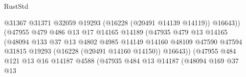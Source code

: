 \begin{lexlean}{RustStd}
\begin{coremodule}
                                                @31367
                                                @31371
                                                @32059
                                                @19293
                                                (@16228 (@20491 @14139 @14119))
                                                @16643))
                                            (@47955
                                              @479
                                              @486
                                              @13
                                              @17
                                              @14165
                                              @14189
                                              (@47935
                                                @479
                                                @13
                                                @14165
                                                (@48094
                                                  @133
                                                  @37
                                                  @13
                                                  @4802
                                                  @4985
                                                  @14149
                                                  @14160
                                                  @48109
                                                  @47590
                                                  @47594
                                                  @31815
                                                  @19293
                                                  (@16228 (@20491 @14160 @14150))
                                                  @16643))
                                              (@47955
                                                @484
                                                @121
                                                @13
                                                @16
                                                @14187
                                                @4588
                                                (@47935
                                                  @484
                                                  @13
                                                  @14187
                                                  (@48094
                                                    @169
                                                    @37
                                                    @13

\end{coremodule}
\end{lexlean}
